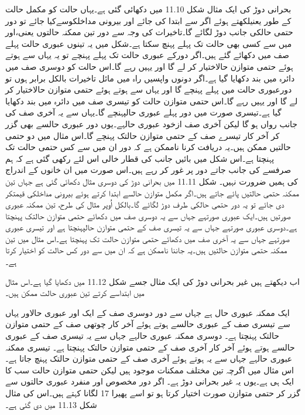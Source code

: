 	بحرانی دوڑ کی ایک مثال شکل 11.10 میں دکھائی گئی ہے۔یہاں حالت کو مکمل حالت کے طور یعنیلکھتے ہوئے اگر سے ابتدا کی جائے اور بیرونی مداخلکوسےکیا جائے تو دور حتمی حالکی جانب دوڑ لگائے گا۔تاخیرات کی وجہ سے دور تین ممکنہ حالتوں یعنی،اور میں سے کسی بھی حالت تک پہلے پہنچ سکتا ہے۔شکل میں یہ تینوں عبوری حالت پہلے صف میں دکھائے گئے ہیں۔اگر دورکے عبوری حالت تک پہلے پہنچے تو یہ یہاں سے ہوتے ہوئے حتمی متوازن حالاختیار کر لے گا اور یہیں رہے گا۔اس حالت کو دوسری صف میں دائرہ میں بند دکھایا گیا ہے۔اگر دونوں واپسیں راہ میں مائل تاخیرات بالکل برابر ہوں تو دورعبوری حالت میں پہلے پہنچے گا اور یہاں سے ہوتے ہوئے حتمی متوازن حالاختیار کر لے گا اور یہیں رہے گا۔اس حتمی متوازن حالت کو تیسری صف میں دائرہ میں بند دکھایا گیا ہے۔تیسری صورت میں دور پہلے عبوری حالپہنچے گا۔یہاں سے یہ آخری صف کی جانب رواں ہو گا لیکن آخری صف ازخود عبوری حالہے۔یوں دور عبوری حالسے بھی گزر کر آخر کار تیسرے صف کے حتمی متوازن حالتک پہنچے گا۔اس مثال میں دو حتمی حالتیں ممکن ہیں۔یہ دریافت کرنا ناممکن ہے کہ دور ان میں سے کس حتمی حالت تک پہنچتا ہے۔اس شکل میں بائیں جانب کی قطار خالی اس لئے رکھی گئی ہے کہ ہم صرفسے کی جانب جاتے دور پر غور کر رہے ہیں۔اس صورت میں ان خانوں کے اندراج کی ہمیں ضرورت نہیں۔
	شکل 11.11 میں بحرانی دوڑ کی دوسری مثال دکھائی گئی ہے جہاں تین ممکنہ حتمی حالتیں پائے جاتے ہیں۔اگر مکمل متوازن حالسے ابتدا کرتے ہوئے بیرونی مداخلکی قیمتکر دی جائے تو یہ دور حتمی حالکی طرف دوڑ لگائے گا۔بالکل اُوپر مثال کی طرح، تین ممکنہ عبوری صورتیں ہیں۔ایک عبوری صورتہے جہاں سے یہ دوسری صف میں دکھائے حتمی متوازن حالتک پہنچتا ہے۔دوسری عبوری صورتہے جہاں سے یہ تیسری صف کے حتمی متوازن حالپہنچتا ہے اور تیسری عبوری صورتہے جہاں سے یہ آخری صف میں دکھائے حتمی متوازن حالت تک پہنچتا ہے۔اس مثال میں تین ممکنہ حتمی متوازن حالتیں ہیں۔یہ جاننا ناممکن ہے  کہ ان میں سے دور کس حالت کو اختیار کرتا ہے۔


	اب دیکھتے ہیں غیر بحرانی دوڑ کی ایک مثال جسے شکل 11.12 میں دکھایا گیا ہے۔اس مثال میں ابتداسے کرتے تین عبوری حالت ممکن ہیں۔


	ایک ممکنہ عبوری حال ہے جہاں سے دور دوسری صف کے ایک اور عبوری حالاور یہاں سے تیسری صف کے عبوری حالسے ہوتے ہوئے آخر کار  چوتھی صف کے حتمی متوازن حالتک پہنچتا ہے۔
	دوسری ممکنہ عبوری حالہے جہاں سے یہ تیسری صف کے عبوری حالسے ہوتے ہوئے آخر کار آخری صف کے حتمی متوازن حالتک پہنچتا ہے۔
	تیسری ممکنہ عبوری حالہے جہاں سے یہ ہوتے ہوئے آخری صف کے حتمی متوازن حالتک پہنچ جاتا ہے۔
	اس مثال میں اگرچہ تین مختلف ممکنات موجود ہیں لیکن حتمی متوازن حالت سب کا ایک ہی ہے۔یوں یہ غیر بحرانی دوڑ ہے۔  
	اگر دور مخصوص اور منفرد عبوری حالتوں سے گزر کر حتمی متوازن صورت اختیار کرتا ہو تو اسے پھیرا 17 لگانا کہتے ہیں۔اس کی مثال شکل 11.13 میں دی گئی ہے۔ 


